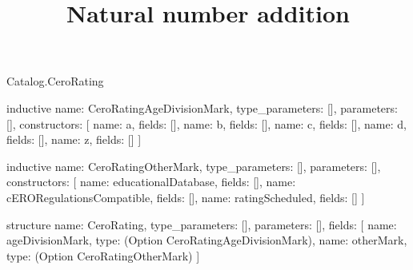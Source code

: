 \begin{lexlean}{Catalog.CeroRating}
\title{Natural number addition}
\begin{semanticmodule}
inductive{
  name: CeroRatingAgeDivisionMark,
  type_parameters: [],
  parameters: [],
  constructors: [
    {name: a, fields: []},
    {name: b, fields: []},
    {name: c, fields: []},
    {name: d, fields: []},
    {name: z, fields: []}
  ]
}

inductive{
  name: CeroRatingOtherMark,
  type_parameters: [],
  parameters: [],
  constructors: [
    {name: educationalDatabase, fields: []},
    {name: cERORegulationsCompatible, fields: []},
    {name: ratingScheduled, fields: []}
  ]
}

structure{
  name: CeroRating,
  type_parameters: [],
  parameters: [],
  fields: [
    {name: ageDivisionMark, type: (Option CeroRatingAgeDivisionMark)},
    {name: otherMark, type: (Option CeroRatingOtherMark)}
  ]
}
\end{semanticmodule}
\end{lexlean}
